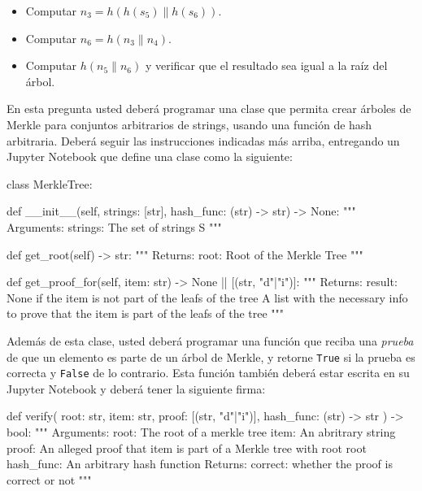 \begin{itemize}
  \item Computar $n_3=h(h(s_5)\|h(s_6))$.
  \item Computar $n_6=h(n_3\|n_4)$.
  \item Computar $h(n_5\|n_6)$ y verificar que el resultado sea igual a la raíz del árbol.
\end{itemize}

En esta pregunta usted deberá programar una clase que permita crear árboles de Merkle para conjuntos arbitrarios de strings, usando una función de hash arbitraria. Deberá seguir las instrucciones indicadas más arriba, entregando un Jupyter Notebook que define una clase como la siguiente:

\bigskip
\begin{python}
  class MerkleTree:
    
    def __init__(self, strings: [str], hash_func: (str) -> str) -> None:
    """
    Arguments:
      strings: The set of strings S
    """

    def get_root(self) -> str:
    """
    Returns:
      root: Root of the Merkle Tree
    """

    def get_proof_for(self, item: str) -> None || [(str, "d"|"i")]:
    """
    Returns:
      result: None if the item is not part of the leafs of the tree
              A list with the necessary info to prove that the
              item is part of the leafs of the tree
    """
\end{python}

Además de esta clase, usted deberá programar una función que reciba una \emph{prueba} de que un elemento es parte de un árbol de Merkle, y retorne \texttt{True} si la prueba es correcta y \texttt{False} de lo contrario. Esta función también deberá estar escrita en su Jupyter Notebook y deberá tener la siguiente firma:

\bigskip
\begin{python}
  def verify(
    root: str,
    item: str,
    proof: [(str, "d"|"i")],
    hash_func: (str) -> str
  ) -> bool:
    """
    Arguments:
      root: The root of a merkle tree
      item: An abritrary string
      proof: An alleged proof that item is part of a Merkle
             tree with root root
      hash_func: An arbitrary hash function
    Returns:
      correct: whether the proof is correct or not
    """
\end{python}
